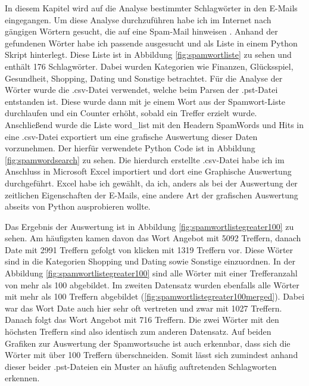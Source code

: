\noindent In diesem Kapitel wird auf die Analyse bestimmter Schlagwörter in den E-Mails eingegangen. Um diese Analyse durchzuführen habe ich im Internet nach gängigen Wörtern gesucht, die auf eine Spam-Mail hinweisen \cite{Heise.07.06.2021}. Anhand der gefundenen Wörter habe ich passende ausgesucht und als Liste in einem Python Skript hinterlegt. Diese Liste ist in Abbildung \ref{fig:spamwortliste} zu sehen und enthält 176 Schlagwörter. Dabei wurden Kategorien wie Finanzen, Glücksspiel, Gesundheit, Shopping, Dating und Sonstige betrachtet. Für die Analyse der Wörter wurde die .csv-Datei verwendet, welche beim Parsen der .pst-Datei entstanden ist. Diese wurde dann mit je einem Wort aus der Spamwort-Liste durchlaufen und ein Counter erhöht, sobald ein Treffer erzielt wurde. Anschließend wurde die Liste \glqq{}word\_list\grqq{} mit den Headern \glqq{}SpamWords\grqq{} und \glqq{}Hits\grqq{} in eine .csv-Datei exportiert um eine grafische Auswertung dieser Daten vorzunehmen. Der hierfür verwendete Python Code ist in Abbildung \ref{fig:spamwordsearch} zu sehen. Die hierdurch erstellte .csv-Datei habe ich im Anschluss in Microsoft Excel importiert und dort eine Graphische Auswertung durchgeführt. Excel habe ich gewählt, da ich, anders als bei der Auswertung der zeitlichen Eigenschaften der E-Mails, eine andere Art der grafischen Auswertung abseits von Python ausprobieren wollte. \smallskip

\noindent Das Ergebnis der Auswertung ist in Abbildung \ref{fig:spamwortlistegreater100} zu sehen. Am häufigsten kamen davon das Wort \glqq{}Angebot\grqq{} mit 5092 Treffern, danach \glqq{}Date\grqq{} mit 2991 Treffern gefolgt von \glqq{}klicken\grqq{} mit 1319 Treffern vor. Diese Wörter sind in die Kategorien Shopping und Dating sowie Sonstige einzuordnen. In der Abbildung \ref{fig:spamwortlistegreater100} sind alle Wörter mit einer Trefferanzahl von mehr als 100 abgebildet. Im zweiten Datensatz wurden ebenfalls alle Wörter mit mehr als 100 Treffern abgebildet (\ref{fig:spamwortlistegreater100merged}). Dabei war das Wort \glqq{}Date\grqq{} auch hier sehr oft vertreten und zwar mit 1027 Treffern. Danach folgt das Wort \glqq{}Angebot\grqq{} mit 716 Treffern. Die zwei Wörter mit den höchsten Treffern sind also identisch zum anderen Datensatz. Auf beiden Grafiken zur Auswertung der Spamwortsuche ist auch erkennbar, dass sich die Wörter mit über 100 Treffern überschneiden. Somit lässt sich zumindest anhand dieser beider .pst-Dateien ein Muster an häufig auftretenden Schlagworten erkennen. 

